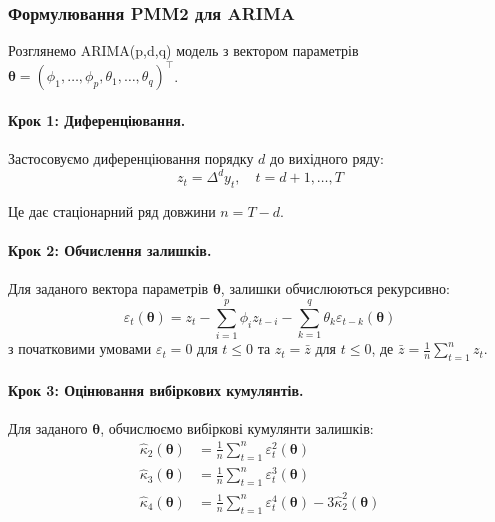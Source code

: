 \documentclass[12pt,a4paper]{article}
\begin{document}
\subsubsection{Формулювання PMM2 для ARIMA}

Розглянемо ARIMA(p,d,q) модель з вектором параметрів $\boldsymbol{\theta} = (\phi_1, \ldots, \phi_p, \theta_1, \ldots, \theta_q)^\top$.

\paragraph{Крок 1: Диференціювання.}

Застосовуємо диференціювання порядку $d$ до вихідного ряду:
\begin{equation}
\label{eq:differenced_series}
z_t = \Delta^d y_t, \quad t = d+1, \ldots, T
\end{equation}

Це дає стаціонарний ряд довжини $n = T - d$.

\paragraph{Крок 2: Обчислення залишків.}

Для заданого вектора параметрів $\boldsymbol{\theta}$, залишки обчислюються рекурсивно:
\begin{equation}
\label{eq:residuals}
\varepsilon_t(\boldsymbol{\theta}) = z_t - \sum_{i=1}^{p} \phi_i z_{t-i} - \sum_{k=1}^{q} \theta_k \varepsilon_{t-k}(\boldsymbol{\theta})
\end{equation}
з початковими умовами $\varepsilon_t = 0$ для $t \leq 0$ та $z_t = \bar{z}$ для $t \leq 0$, де $\bar{z} = \frac{1}{n}\sum_{t=1}^{n} z_t$.

\paragraph{Крок 3: Оцінювання вибіркових кумулянтів.}

Для заданого $\boldsymbol{\theta}$, обчислюємо вибіркові кумулянти залишків:
\begin{align}
\hat{\kappa}_2(\boldsymbol{\theta}) &= \frac{1}{n} \sum_{t=1}^{n} \varepsilon_t^2(\boldsymbol{\theta}) \label{eq:sample_k2} \\
\hat{\kappa}_3(\boldsymbol{\theta}) &= \frac{1}{n} \sum_{t=1}^{n} \varepsilon_t^3(\boldsymbol{\theta}) \label{eq:sample_k3} \\
\hat{\kappa}_4(\boldsymbol{\theta}) &= \frac{1}{n} \sum_{t=1}^{n} \varepsilon_t^4(\boldsymbol{\theta}) - 3\hat{\kappa}_2^2(\boldsymbol{\theta}) \label{eq:sample_k4}
\end{align}
\end{document}
